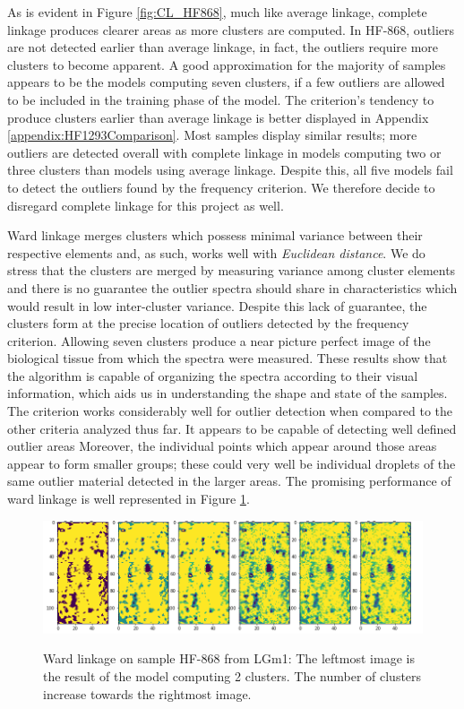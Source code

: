 As is evident in Figure \ref{fig:CL_HF868}, much like average linkage, complete linkage produces clearer areas as more clusters are computed. In HF-868, outliers are not detected earlier than average linkage, in fact, the outliers require more clusters to become apparent. A good approximation for the majority of samples appears to be the models computing seven clusters, if a few outliers are allowed to be included in the training phase of the model. The criterion's tendency to produce clusters earlier than average linkage is better displayed in Appendix \ref{appendix:HF1293Comparison}. Most samples display similar results; more outliers are detected overall with complete linkage in models computing two or three clusters than models using average linkage. Despite this, all five models fail to detect the outliers found by the frequency criterion. We therefore decide to disregard complete linkage for this project as well.

Ward linkage merges clusters which possess minimal variance between their respective elements and, as such, works well with \textit{Euclidean distance}. We do stress that the clusters are merged by measuring variance among cluster elements and there is no guarantee the outlier spectra should share in characteristics which would result in low inter-cluster variance. Despite this lack of guarantee, the clusters form at the precise location of outliers detected by the frequency criterion. Allowing seven clusters produce a near picture perfect image of the biological tissue from which the spectra were measured. These results show that the algorithm is capable of organizing the spectra according to their visual information, which aids us in understanding the shape and state of the samples. The criterion works considerably well for outlier detection when compared to the other criteria analyzed thus far. It appears to be capable of detecting well defined outlier areas Moreover, the individual points which appear around those areas appear to form smaller groups; these could very well be individual droplets of the same outlier material detected in the larger areas. The promising performance of ward linkage is well represented in Figure \ref{fig:WL_HF868}.

\begin{figure}[H]

    \centering
{\includegraphics[width=15cm]{images/Ward_linkage/LGm-1/HF-868_1_2.h5_0.png} }
\caption{Ward linkage on sample HF-868 from LGm1: The leftmost image is the result of the model computing 2 clusters. The number of clusters increase towards the rightmost image.\label{fig:WL_HF868}}%

\end{figure}

